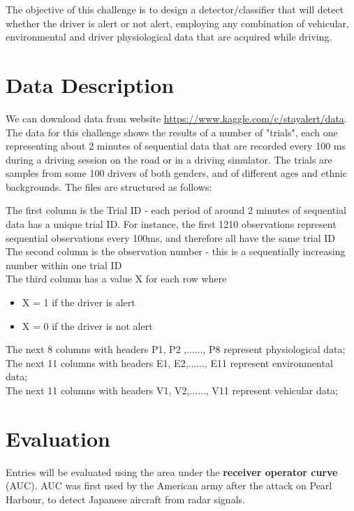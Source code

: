 \documentclass[11pt]{article}
\begin{document}
\begin{singlespacing}
The objective of this challenge is to design a detector/classifier that will detect whether the driver is alert or not alert, employing any combination of vehicular, environmental and driver physiological data that are acquired while driving.

\section{Data Description} %
We can download data from website \url{https://www.kaggle.com/c/stayalert/data}. The data for this challenge shows the results of a number of "trials", each one representing about 2 minutes of sequential data that are recorded every 100 ms during a driving session on the road or in a driving simulator.  The trials are samples from some 100 drivers of both genders, and of different ages and ethnic backgrounds. The files are structured as follows:

The first column is the Trial ID - each period of around 2 minutes of sequential data has a unique trial ID. For instance, the first 1210 observations represent sequential observations every 100ms, and therefore all have the same trial ID \\
The second column is the observation number - this is a sequentially increasing number within one trial ID \\
The third column has a value X for each row where   
\begin{itemize}
\item X = 1     if the driver is alert 
\item X = 0     if the driver is not alert 
\end{itemize}
The next 8 columns with headers P1, P2 ,......, P8  represent physiological data;\\
The next 11 columns with headers E1, E2,......, E11  represent environmental data;\\
The next 11 columns with headers V1, V2,......, V11  represent vehicular  data;\\



\section{Evaluation}
Entries will be evaluated using the area under the \textbf{receiver operator curve} (AUC). AUC was first used by the American army after the attack on Pearl Harbour, to detect Japanese aircraft from radar signals.


\end{singlespacing}
\end{document}
